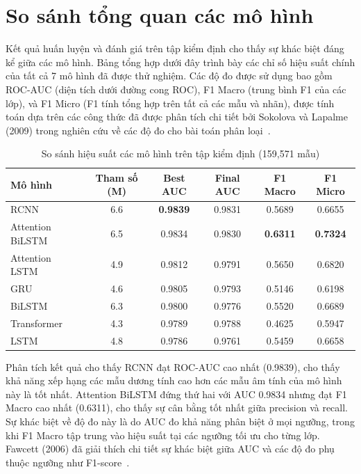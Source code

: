 \documentclass[../BTL.tex]{subfiles}
\begin{document}
\section{So sánh tổng quan các mô hình}

Kết quả huấn luyện và đánh giá trên tập kiểm định cho thấy sự khác biệt đáng kể giữa các mô hình. Bảng tổng hợp dưới đây trình bày các chỉ số hiệu suất chính của tất cả 7 mô hình đã được thử nghiệm. Các độ đo được sử dụng bao gồm ROC-AUC (diện tích dưới đường cong ROC), F1 Macro (trung bình F1 của các lớp), và F1 Micro (F1 tính tổng hợp trên tất cả các mẫu và nhãn), được tính toán dựa trên các công thức đã được phân tích chi tiết bởi Sokolova và Lapalme (2009) trong nghiên cứu về các độ đo cho bài toán phân loại~\cite{sokolova2009systematic}.

\begin{table}[H]
\centering
\small
\begin{tabular}{|l|c|c|c|c|c|}
\hline
\textbf{Mô hình} & \textbf{Tham số (M)} & \textbf{Best AUC} & \textbf{Final AUC} & \textbf{F1 Macro} & \textbf{F1 Micro} \\ \hline
RCNN & 6.6 & \textbf{0.9839} & 0.9831 & 0.5689 & 0.6655 \\ \hline
Attention BiLSTM & 6.5 & 0.9834 & 0.9830 & \textbf{0.6311} & \textbf{0.7324} \\ \hline
Attention LSTM & 4.9 & 0.9812 & 0.9791 & 0.5650 & 0.6820 \\ \hline
GRU & 4.6 & 0.9805 & 0.9793 & 0.5146 & 0.6198 \\ \hline
BiLSTM & 6.3 & 0.9800 & 0.9776 & 0.5520 & 0.6689 \\ \hline
Transformer & 4.3 & 0.9789 & 0.9788 & 0.4625 & 0.5947 \\ \hline
LSTM & 4.8 & 0.9786 & 0.9761 & 0.5459 & 0.6658 \\ \hline
\end{tabular}
\caption{So sánh hiệu suất các mô hình trên tập kiểm định (159,571 mẫu)}
\label{tab:model_comparison}
\end{table}

Phân tích kết quả cho thấy RCNN đạt ROC-AUC cao nhất (0.9839), cho thấy khả năng xếp hạng các mẫu dương tính cao hơn các mẫu âm tính của mô hình này là tốt nhất. Attention BiLSTM đứng thứ hai với AUC 0.9834 nhưng đạt F1 Macro cao nhất (0.6311), cho thấy sự cân bằng tốt nhất giữa precision và recall. Sự khác biệt về độ đo này là do AUC đo khả năng phân biệt ở mọi ngưỡng, trong khi F1 Macro tập trung vào hiệu suất tại các ngưỡng tối ưu cho từng lớp. Fawcett (2006) đã giải thích chi tiết sự khác biệt giữa AUC và các độ đo phụ thuộc ngưỡng như F1-score~\cite{fawcett2006introduction}.
\end{document}
